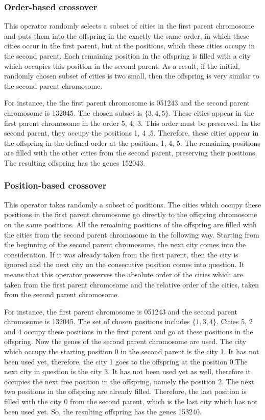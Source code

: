 \documentclass[a4paper, 12pt, headings=standardclasses]{scrartcl}
\begin{document}
\subsubsection{Order-based crossover}
This operator randomly selects a subset of cities in the first parent chromosome and puts them into the offspring in the exactly the same order, in which these cities occur in the first parent, but at the positions, which these cities occupy in the second parent. Each remaining position in the offspring is filled with a city which occupies this position in the second parent. As a result, if the initial, randomly chosen subset of cities is two small, then the offspring is very similar to the second parent chromosome.\par

For instance, the the first parent chromosome is 051243 and the second parent chromosome is 132045. The chosen subset is $\{3,4,5\}$. These cities appear in the first parent chromosome in the order 5, 4, 3. This order must be preserved. In the second parent, they occupy the positions 1, 4 ,5. Therefore, these cities appear in the offspring in the defined order at the positions 1, 4, 5. The remaining positions are filled with the other cities from the second parent, preserving their positions. The resulting offspring has the genes 152043.

\subsubsection{Position-based crossover}
This operator takes randomly a subset of positions. The cities which occupy these positions in the first parent chromosome go directly to the offspring chromosome on the same positions. All the remaining positions of the offspring are filled with the cities from the second parent chromosome in the following way. Starting from the beginning of the second parent chromosome, the next city comes into the consideration. If it was already taken from the first parent, then the city is ignored and the next city on the consecutive position comes into question. It means that this operator preserves the absolute order of the cities which are taken from the first parent chromosome and the relative order of the cities, taken from the second parent chromosome.\par
For instance, the first parent chromosome is 051243 and the second parent chromosome is 132045. The set of chosen positions includes $\{1,3,4\}$. Cities 5, 2 and 4 occupy these  positions in the first parent and go at these positions in the offspring. Now the genes of the second parent chromosome are used. The city which occupy the starting position 0 in the second parent is the city 1. It has not been used yet, therefore, the city 1 goes to the offspring at the position 0.The next city in question is the city 3. It has not been used yet as well, therefore it occupies the next free position in the offspring, namely the position 2. The next two positions in the offspring are already filled. Therefore, the last position is filled with the city 0 from the second parent, which is the last city which has not been used yet.
So, the resulting offspring has the genes 153240.\par
\end{document}
